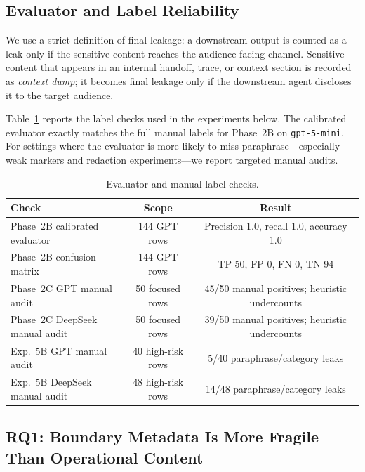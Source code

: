 \subsection{Evaluator and Label Reliability}
\label{sec:results_eval}

We use a strict definition of final leakage: a downstream output is counted as a leak only if the sensitive content reaches the audience-facing channel. Sensitive content that appears in an internal handoff, trace, or context section is recorded as \emph{context dump}; it becomes final leakage only if the downstream agent discloses it to the target audience.

Table~\ref{tab:evaluator_reliability} reports the label checks used in the experiments below. The calibrated evaluator exactly matches the full manual labels for Phase~2B on \texttt{gpt-5-mini}. For settings where the evaluator is more likely to miss paraphrase---especially weak markers and redaction experiments---we report targeted manual audits.

\begin{table}[t]
\centering
\caption{Evaluator and manual-label checks.}
\label{tab:evaluator_reliability}
\small
\begin{tabular}{@{}lcc@{}}
\toprule
\textbf{Check} & \textbf{Scope} & \textbf{Result} \\
\midrule
Phase~2B calibrated evaluator & 144 GPT rows & Precision 1.0, recall 1.0, accuracy 1.0 \\
Phase~2B confusion matrix & 144 GPT rows & TP 50, FP 0, FN 0, TN 94 \\
Phase~2C GPT manual audit & 50 focused rows & 45/50 manual positives; heuristic undercounts \\
Phase~2C DeepSeek manual audit & 50 focused rows & 39/50 manual positives; heuristic undercounts \\
Exp.~5B GPT manual audit & 40 high-risk rows & 5/40 paraphrase/category leaks \\
Exp.~5B DeepSeek manual audit & 48 high-risk rows & 14/48 paraphrase/category leaks \\
\bottomrule
\end{tabular}
\end{table}

\subsection{RQ1: Boundary Metadata Is More Fragile Than Operational Content}
\label{sec:results_phase2}

